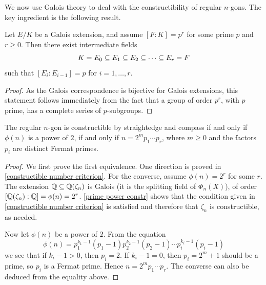 We now use Galois theory to deal with the constructibility of regular $n$-gons. The key ingredient is the following result.
\begin{proposition}\label{prime power constr}
Let $E/K$ be a Galois extension, and assume $[F:K]=p^r$ for some prime $p$ and $r\geq 0$. Then there exist intermediate fields
\[K=E_0\subseteq E_1\subseteq E_2\subseteq\cdots\subseteq E_r=F\]
such that $[E_i:E_{i-1}]=p$ for $i=1,\dots,r$.
\end{proposition}
\begin{proof}
As the Galois correspondence is bijective for Galois extensions, this statement follows immediately from the fact that a group of order $p^r$, with $p$ prime, has a complete series of $p$-subgroups.
\end{proof}
\begin{theorem}\label{constructible regular n-gon iff}
The regular $n$-gon is constructible by straightedge and compass if and only if $\phi(n)$ is a power of $2$, if and only if $n=2^mp_1\cdots p_r$, where $m\geq 0$ and the factors $p_i$ are distinct Fermat primes.
\end{theorem}
\begin{proof}
We first prove the first equivalence. One direction is proved in \cref{constructible number criterion}. For the converse, assume $\phi(n)=2^r$ for some $r$. The extension $\mathbb{Q}\subseteq\mathbb{Q}(\zeta_n)$ is Galois (it is the splitting field of $\Phi_n(X)$), of order $[\mathbb{Q}(\zeta_n):\mathbb{Q}]=\phi(n)=2^r$. \cref{prime power constr} shows that the condition given in \cref{constructible number criterion} is satisfied and therefore that $\zeta_n$ is constructible, as needed.\par
Now let $\phi(n)$ be a power of $2$. From the equation
\[\phi(n)=p_1^{k_1-1}(p_1-1)p_2^{k_2-1}(p_2-1)\cdots p_i^{k_i-1}(p_i-1)\]
we see that if $k_i-1>0$, then $p_i=2$. If $k_i-1=0$, then $p_i=2^m+1$ should be a prime, so $p_i$ is a Fermat prime. Hence $n=2^mp_1\cdots p_r$. The converse can also be deduced from the equality above.
\end{proof}
